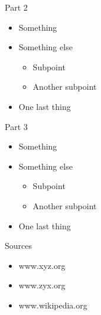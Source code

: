 \documentclass[aspectratio=169]{beamer}
\begin{document}
    \begin{frame}{Part 2}
        \begin{itemize}
            \pause
            \item Something
            \pause
            \item Something else
            \begin{itemize}
                \item Subpoint
                \item Another subpoint
            \end{itemize}
            \pause
            \item One last thing
        \end{itemize}
    \end{frame}

    \begin{frame}{Part 3}
        \begin{itemize}
            \pause
            \item Something
            \pause
            \item Something else
            \begin{itemize}
                \item Subpoint
                \item Another subpoint
            \end{itemize}
            \pause
            \item One last thing
        \end{itemize}
    \end{frame}

    \begin{frame}{Sources}
        \begin{itemize}
            \item www.xyz.org
            \item www.zyx.org
            \item www.wikipedia.org
        \end{itemize}
    \end{frame}
\end{document}
